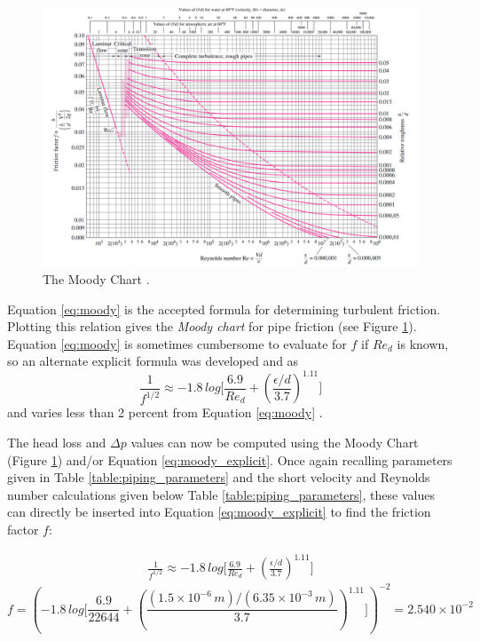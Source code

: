 \documentclass[9pt]{article} %
\numberwithin{equation}{section} %
\begin{document}
\begin{figure}[!htb]
\centering
\includegraphics[scale=0.55]{moody_chart.PNG}
\caption{The Moody Chart \cite{fluid-mechanics}.}
\label{fig:moody_chart}
\end{figure}

Equation \ref{eq:moody} is the accepted formula for determining turbulent friction. Plotting this relation gives the \textit{Moody chart} for pipe friction (see Figure \ref{fig:moody_chart}). Equation \ref{eq:moody} is sometimes cumbersome to evaluate for $f$ if $Re_{d}$ is known, so an alternate explicit formula was developed and as
\begin{equation} \label{eq:moody_explicit}
\frac{1}{f^{1/2}} \approx -1.8\, log \Big[ \frac{6.9}{Re_{d}} + \left( \frac{\epsilon / d}{3.7} \right)^{1.11} \Big]
\end{equation}
and varies less than 2 percent from Equation \ref{eq:moody} \cite{fluid-mechanics}.

The head loss and $\Delta p$ values can now be computed using the Moody Chart (Figure \ref{fig:moody_chart}) and/or Equation \ref{eq:moody_explicit}. Once again recalling parameters given in Table \ref{table:piping_parameters} and the short velocity and Reynolds number calculations given below Table \ref{table:piping_parameters}, these values can directly be inserted into Equation \ref{eq:moody_explicit} to find the friction factor $f$:

\begin{align*}
\frac{1}{f^{1/2}} \approx -1.8\, log \Big[ \frac{6.9}{Re_{d}} + \left( \frac{\epsilon / d}{3.7} \right)^{1.11} \Big]
\end{align*}
\begin{equation*}
f = \left( -1.8\, log \Bigg[ \frac{6.9}{22644} + \left( \frac{(1.5 \times 10^{-6}\, m)/(6.35 \times 10^{-3}\, m)}{3.7} \right) ^{1.11} \Bigg] \right)^{-2} = 2.540 \times 10^{-2}
\end{equation*}
\end{document}

